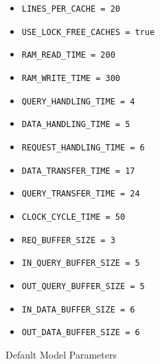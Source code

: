 \begin{figure}[hbt!]
\begin{multicols}{2}
\begin{itemize}
\item \lstinline!LINES_PER_CACHE = 20!
\item \lstinline!USE_LOCK_FREE_CACHES = true!
\item \lstinline!RAM_READ_TIME = 200!
\item \lstinline!RAM_WRITE_TIME = 300!
\item \lstinline!QUERY_HANDLING_TIME = 4!
\item \lstinline!DATA_HANDLING_TIME = 5!
\item \lstinline!REQUEST_HANDLING_TIME = 6!
\item \lstinline!DATA_TRANSFER_TIME = 17!
\item \lstinline!QUERY_TRANSFER_TIME = 24!
\item \lstinline!CLOCK_CYCLE_TIME = 50!
\item \lstinline!REQ_BUFFER_SIZE = 3!
\item \lstinline!IN_QUERY_BUFFER_SIZE = 5!
\item \lstinline!OUT_QUERY_BUFFER_SIZE = 5!
\item \lstinline!IN_DATA_BUFFER_SIZE = 6!
\item \lstinline!OUT_DATA_BUFFER_SIZE = 6!
\end{itemize}
\end{multicols}
\caption{Default Model Parameters}
\label{fig:analysis:demo_params}
\end{figure}
